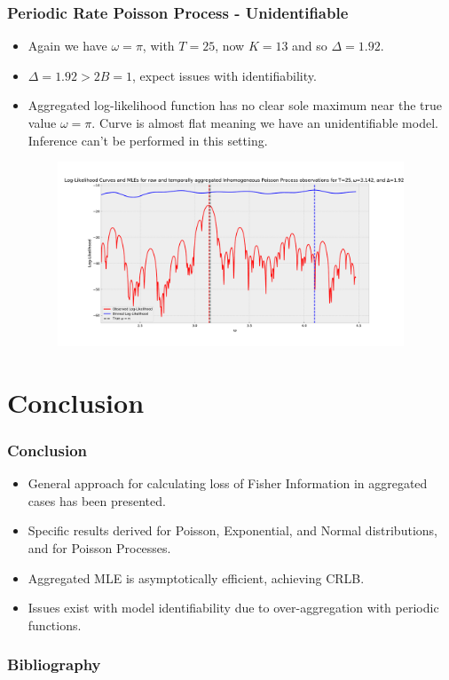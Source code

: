 \documentclass[11pt]{beamer}
\begin{document}
\begin{frame}
	\frametitle{Periodic Rate Poisson Process - Unidentifiable}
	\begin{itemize}
		\item Again we have $\omega= \pi$, with $T=25$, now $K=13$ and so $\Delta=1.92$.
		\item $\Delta = 1.92 > 2B = 1$, expect issues with identifiability.
		\item Aggregated log-likelihood function has no clear sole maximum near the true value $\omega=\pi$. Curve is almost flat meaning we have an unidentifiable model. Inference can't be performed in this setting.
	\end{itemize}
	\begin{figure}[!h]
		\includegraphics[height=5.5cm, width=12cm]{nhpp_periodic_unid_log_likeli.pdf}
	\end{figure}
\end{frame}

\section{Conclusion}
\begin{frame}
	\frametitle{Conclusion}
	\begin{itemize}
		\item General approach for calculating loss of Fisher Information in aggregated cases has been presented.
		\item Specific results derived for Poisson, Exponential, and Normal distributions, and for Poisson Processes.
		\item Aggregated MLE is asymptotically efficient, achieving CRLB.
		\item Issues exist with model identifiability due to over-aggregation with periodic functions.
	\end{itemize}
\end{frame}

\begin{frame}
	\frametitle{Bibliography}
\end{frame}
\end{document}
